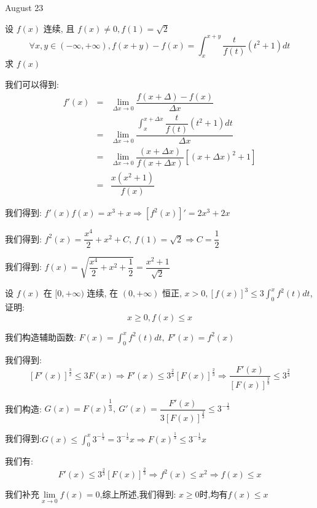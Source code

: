 \textcolor{purplea}{August 23}

\begin{example}[][Exam: 34.4.3]
	设 $f(x)$ 连续, 且 $f(x)\neq 0,f(1)=\sqrt{2}$
	$$\forall x,y\in(-\infty,+\infty), f(x+y)-f(x)=\int_{x}^{x+y}\dfrac{t}{f(t)}(t^2+1)dt$$
	求 $f(x)$
\end{example}

\begin{solution}

	我们可以得到:
	\begin{eqnarray*}
		f'(x)&=&\lim\limits_{\Delta x\to 0}\dfrac{f(x+\Delta)-f(x)}{\Delta x}\\
		&=&\lim\limits_{\Delta x\to 0}\dfrac{\int_{x}^{x+\Delta x}\dfrac{t}{f(t)}(t^2+1)dt}{\Delta x}\\
		&=&\lim\limits_{\Delta x\to 0}\dfrac{(x+\Delta x)}{f(x+\Delta x)}\left[ (x+\Delta x)^2+1\right] \\
		&=&\dfrac{x(x^2+1)}{f(x)}
	\end{eqnarray*}

	我们得到:  $f'(x)f(x)=x^3+x\Rightarrow [f^2(x)]'=2x^3+2x$
	
	我们得到:  $f^{2}(x)=\dfrac{x^4}{2}+x^2+C,\ f(1)=\sqrt{2}\Rightarrow C=\dfrac{1}{2}$
	
	我们得到:  $f(x)=\sqrt{\dfrac{x^4}{2}+x^2+\dfrac{1}{2}}=\dfrac{x^2+1}{\sqrt{2}}$
\end{solution}

\begin{example}[][Exam: 34.4.4]
	设 $f(x)$ 在 $[0,+\infty)$ 连续, 在 $(0,+\infty)$ 恒正,
	$x>0, \left[ f(x)\right]^3\leq 3\int_{0}^{x}f^{2}(t)dt$,
	证明: $$x\geq 0, f(x)\leq x$$
\end{example}

\begin{solution}

	我们构造辅助函数:  $F(x)=\int_{0}^{x}f^{2}(t)dt,\ F'(x)=f^{2}(x)$
	
	我们得到:  $$[F'(x)]^{\frac{3}{2}}\leq 3F(x)\Rightarrow F'(x)\leq 3^{\frac{2}{3}}[F(x)]^{\frac{2}{3}}\Rightarrow \dfrac{F'(x)}{[F(x)]^{\frac{2}{3}}}\leq 3^{\frac{2}{3}}$$
	
	我们构造:  $G(x)=F(x)^{\dfrac{1}{3}},\ G'(x)=\dfrac{F'(x)}{3[F(x)]^{\frac{2}{3}}}\leq 3^{-\frac{1}{3}}$
	
	我们得到:$G(x)\leq \int_{0}^{x}3^{-\frac{1}{3}}=3^{-\frac{1}{3}}x\Rightarrow F(x)^{\frac{1}{3}}\leq3^{-\frac{1}{3}}x$
	
	我们有:$$F'(x)\leq 3^{\frac{2}{3}}[F(x)]^{\frac{2}{3}}\Rightarrow f^{2}(x)\leq x^2\Rightarrow f(x)\leq x$$

	我们补充$\lim\limits_{x\to 0}f(x)=0$,综上所述,我们得到:  $x\geq 0\text{时,均有}f(x)\leq x$	
	
\end{solution}


